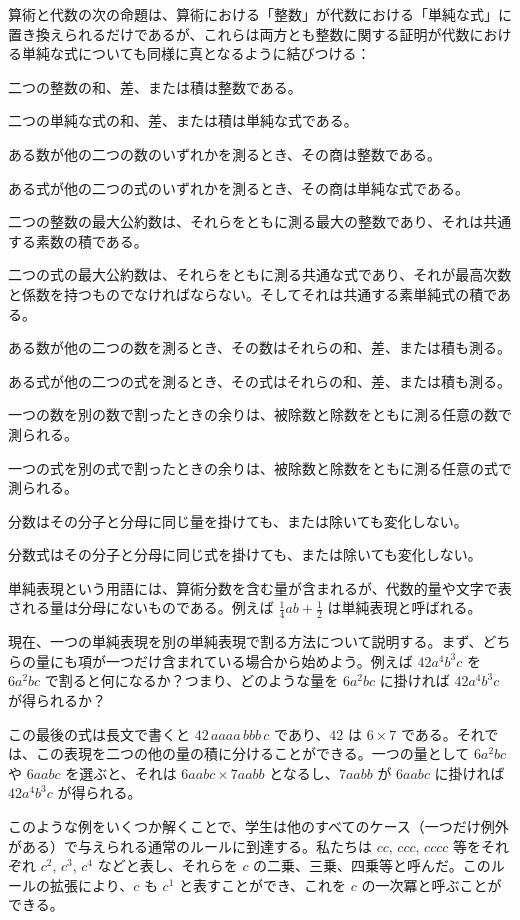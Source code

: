 \documentclass[a4paper,11pt,openany]{ltjsbook}
\newcommand{\CompBox}[1]{\begin{minipage}[t]{0.45\textwidth}\small #1\end{minipage}}
\newcommand{\Comparison}[2]{\par\noindent\vspace{8pt}\CompBox{#1}\hfil\CompBox{#2}\par}
\begin{document}
算術と代数の次の命題は、算術における「整数」が代数における「単純な式」に置き換えられるだけであるが、これらは両方とも整数に関する証明が代数における単純な式についても同様に真となるように結びつける：
\Comparison{
二つの整数の和、差、または積は整数である。
}{
二つの単純な式の和、差、または積は単純な式である。}

\Comparison{
ある数が他の二つの数のいずれかを測るとき、その商は整数である。
}{
ある式が他の二つの式のいずれかを測るとき、その商は単純な式である。}

\Comparison{
二つの整数の最大公約数は、それらをともに測る最大の整数であり、それは共通する素数の積である。
}{
二つの式の最大公約数は、それらをともに測る共通な式であり、それが最高次数と係数を持つものでなければならない。そしてそれは共通する素単純式の積である。}

\Comparison{
ある数が他の二つの数を測るとき、その数はそれらの和、差、または積も測る。
}{
ある式が他の二つの式を測るとき、その式はそれらの和、差、または積も測る。}

\Comparison{
一つの数を別の数で割ったときの余りは、被除数と除数をともに測る任意の数で測られる。
}{
一つの式を別の式で割ったときの余りは、被除数と除数をともに測る任意の式で測られる。}
\Comparison{
分数はその分子と分母に同じ量を掛けても、または除いても変化しない。
}{
分数式はその分子と分母に同じ式を掛けても、または除いても変化しない。}

単純表現という用語には、算術分数を含む量が含まれるが、代数的量や文字で表される量は分母にないものである。例えば $\frac{1}{4} ab + \frac{1}{2}$ は単純表現と呼ばれる。

現在、一つの単純表現を別の単純表現で割る方法について説明する。まず、どちらの量にも項が一つだけ含まれている場合から始めよう。例えば $42a^{4} b^{3} c$ を $6a^{2} bc$ で割ると何になるか？つまり、どのような量を $6a^{2} bc$ に掛ければ $42 a^{4} b^{3} c$ が得られるか？

この最後の式は長文で書くと $42\, aaaa\, bbb\, c$ であり、$42$ は $6 × 7$ である。それでは、この表現を二つの他の量の積に分けることができる。一つの量として $6a^{2} bc$ や $6aabc$ を選ぶと、それは $6aabc × 7aabb$ となるし、$7aabb$ が $6aabc$ に掛ければ $42a^{4} b^{3} c$ が得られる。

このような例をいくつか解くことで、学生は他のすべてのケース（一つだけ例外がある）で与えられる通常のルールに到達する。私たちは $cc$, $ccc$, $cccc$ 等をそれぞれ $c^{2}$, $c^{3}$, $c^{4}$ などと表し、それらを $c$ の二乗、三乗、四乗等と呼んだ。このルールの拡張により、$c$ も $c^{1}$ と表すことができ、これを $c$ の一次冪と呼ぶことができる。
\end{document}
